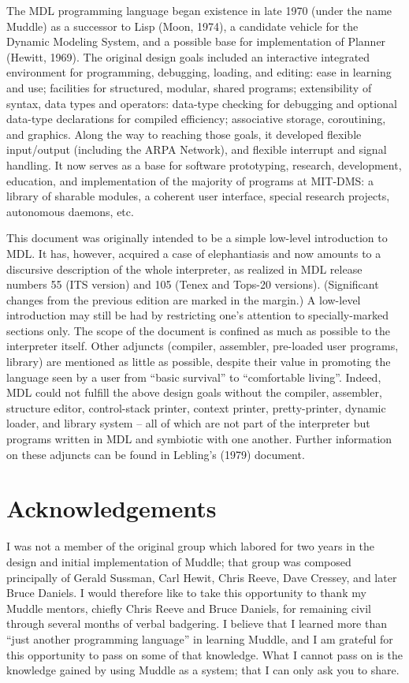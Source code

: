 \documentclass[a4paper]{scrbook}
\begin{document}
The MDL programming language began existence in late 1970 (under the name Muddle) as a successor to Lisp (Moon, 1974), a
candidate vehicle for the Dynamic Modeling System, and a possible base for implementation of Planner (Hewitt, 1969). The
original design goals included an interactive integrated environment for programming, debugging, loading, and editing: ease
in learning and use; facilities for structured, modular, shared programs; extensibility of syntax, data types and
operators: data-type checking for debugging and optional data-type declarations for compiled efficiency; associative
storage, coroutining, and graphics. Along the way to reaching those goals, it developed flexible input/output (including
the ARPA Network), and flexible interrupt and signal handling. It now serves as a base for software prototyping, research,
development, education, and implementation of the majority of programs at MIT-DMS: a library of sharable modules, a
coherent user interface, special research projects, autonomous daemons, etc.

This document was originally intended to be a simple low-level introduction to MDL. It has, however, acquired a case of
elephantiasis and now amounts to a discursive description of the whole interpreter, as realized in MDL release numbers 55
(ITS version) and 105 (Tenex and Tops-20 versions). (Significant changes from the previous edition are marked in the
margin.) A low-level introduction may still be had by restricting one's attention to specially-marked sections only. The
scope of the document is confined as much as possible to the interpreter itself. Other adjuncts (compiler, assembler,
pre-loaded user programs, library) are mentioned as little as possible, despite their value in promoting the language seen
by a user from ``basic survival'' to ``comfortable living''. Indeed, MDL could not fulfill the above design goals without
the compiler, assembler, structure editor, control-stack printer, context printer, pretty-printer, dynamic loader, and
library system -- all of which are not part of the interpreter but programs written in MDL and symbiotic with one another.
Further information on these adjuncts can be found in Lebling's (1979) document.

\chapter*{Acknowledgements}\label{acknowledgements}


I was not a member of the original group which labored for two years in the design and initial implementation of Muddle;
that group was composed principally of Gerald Sussman, Carl Hewit, Chris Reeve, Dave Cressey, and later Bruce Daniels. I
would therefore like to take this opportunity to thank my Muddle mentors, chiefly Chris Reeve and Bruce Daniels, for
remaining civil through several months of verbal badgering. I believe that I learned more than ``just another programming
language'' in learning Muddle, and I am grateful for this opportunity to pass on some of that knowledge. What I cannot pass
on is the knowledge gained by using Muddle as a system; that I can only ask you to share.
\end{document}
